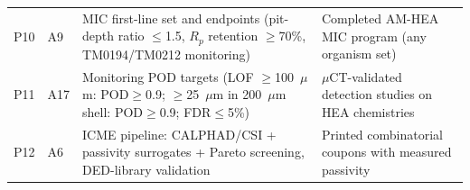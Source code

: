 \begin{table}[t]
\begin{tabularx}{\textwidth}{@{}llXX@{}}
P10 & A9 & MIC first-line set and endpoints (pit-depth ratio $\leq$1.5, $R_p$ retention $\geq$70\%, TM0194/TM0212 monitoring) & Completed AM-HEA MIC program (any organism set) \\
P11 & A17 & Monitoring POD targets (LOF $\geq$100~$\mu$m: POD$\geq$0.9; $\geq$25~$\mu$m in 200~$\mu$m shell: POD$\geq$0.9; FDR$\leq$5\%) & $\mu$CT-validated detection studies on HEA chemistries \\
P12 & A6 & ICME pipeline: CALPHAD/CSI + passivity surrogates + Pareto screening, DED-library validation & Printed combinatorial coupons with measured passivity \\
\bottomrule
\end{tabularx}
\end{table}
